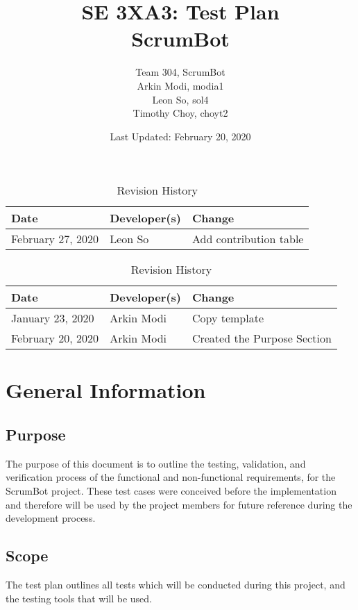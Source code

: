 \documentclass[12pt, titlepage]{article}
\title{SE 3XA3: Test Plan\\ScrumBot}
\author{
	Team 304, ScrumBot
		\\ Arkin Modi, modia1
        \\ Leon So, sol4
        \\ Timothy Choy, choyt2
}
\date{Last Updated: February 20, 2020}
\begin{document}
\begin{table}[hp]
    \caption{Revision History} \label{TblRevisionHistory}
    \begin{tabularx}{\textwidth}{llX}
        \toprule
            \textbf{Date} & \textbf{Developer(s)} & \textbf{Change}\\
        \midrule
            February 27, 2020 & Leon So & Add contribution table\\
        \bottomrule
    \end{tabularx}
\end{table}

\newpage
\maketitle

\tableofcontents
\listoftables
\listoffigures

\begin{table}[bp]
    \caption{Revision History} \label{TblRevisionHistory}
    \begin{tabularx}{\textwidth}{llX}
        \toprule
            \textbf{Date} & \textbf{Developer(s)} & \textbf{Change}\\
        \midrule
            January 23, 2020 & Arkin Modi & Copy template\\
            February 20, 2020 & Arkin Modi & Created the Purpose Section\\
        \bottomrule
    \end{tabularx}
\end{table}

\newpage


\section{General Information}

\subsection{Purpose}
The purpose of this document is to outline the testing, validation, and verification process of the functional and non-functional requirements, for the ScrumBot project. These test cases were conceived before the implementation and therefore will be used by the project members for future reference during the development process.

\subsection{Scope}
The test plan outlines all tests which will be conducted during this project, and the testing tools that will be used.
\end{document}
